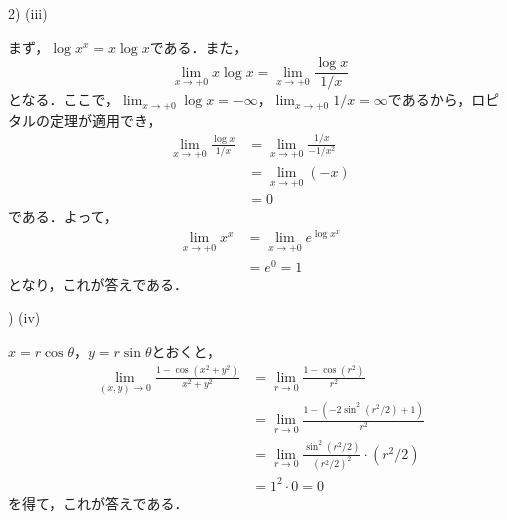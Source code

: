 \documentclass[dvipdfmx,uplatex,11pt]{jsarticle}
\theoremstyle{definition}
\begin{document}
2) (iii)
\begin{leftbar}
    まず，$\log x^x = x \log x$である．また，
    \[
        \lim_{x \to +0} x \log x  =\lim_{x \to +0} \frac{\log x}{1/x} 
    \]
    となる．ここで，$\lim_{x \to +0} \log x = -\infty$，$\lim_{x \to +0} 1/x =\infty$であるから，ロピタルの定理が適用でき，
    \begin{align*}
        \lim_{x \to +0} \frac{\log x}{1/x} & = \lim_{x \to +0} \frac{1/x}{-1/x^2} \\
        & = \lim_{x \to +0} (-x) \\
        & =0
    \end{align*}
    である．よって，
    \begin{align*}
    \lim_{x \to +0} x^x &= \lim_{x \to +0} e^{\log x^x} \\
    & =e^0 =1
    \end{align*}
    となり，これが答えである．
\end{leftbar}

) (iv)
\begin{leftbar}
    $x=r \cos \theta$，$y=r\sin \theta$とおくと，
    \begin{align*}
        \lim_{(x,y)\to 0} \frac{1-\cos (x^2+y^2)}{x^2+y^2} & = \lim_{r \to 0} \frac{1-\cos (r^2)}{r^2} \\
        & =\lim_{r \to 0} \frac{1-(-2\sin ^2 (r^2/2)+1)}{r^2} \\
        & =\lim_{r \to 0} \frac{\sin ^2 (r^2/2)}{(r^2/2)^2} \cdot (r^2/2) \\
        & = 1^2 \cdot 0 =0
    \end{align*}
    を得て，これが答えである．
\end{leftbar}

\newpage
\end{document}
